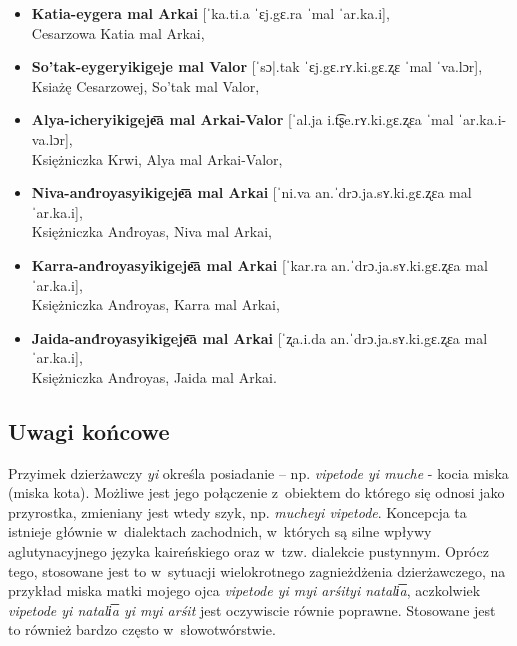 \begin{spacing}{1.1}
\begin{itemize}
\item \textbf{Katia-eygera mal Arkai} [ˈka.ti.a ˈɛj.gɛ.ra ˈmal ˈar.ka.i],\\ 
Cesarzowa Katia mal Arkai,
\item \textbf{So'tak-eygeryikigeje mal Valor} [ˈsɔ|.tak ˈɛj.gɛ.rʏ.ki.gɛ.ʐɛ 
ˈmal ˈva.lɔr],\\ Ksiażę Cesarzowej, So'tak mal Valor,
\item \textbf{Alya-icheryikigeje͞a mal Arkai-Valor} [ˈal.ja i.t͡ʂe.rʏ.ki.gɛ.ʐɛa ˈmal 
ˈar.ka.i-va.lɔr],\\ Księżniczka Krwi, Alya mal Arkai-Valor,
\item \textbf{Niva-and́royasyikigeje͞a mal Arkai} [ˈni.va an.ˈdrɔ.ja.sʏ.ki.gɛ.ʐɛa 
mal ˈar.ka.i],\\ Księżniczka And́royas, Niva mal Arkai,
\item \textbf{Karra-and́royasyikigeje͞a mal Arkai} [ˈkar.ra an.ˈdrɔ.ja.sʏ.ki.gɛ.ʐɛa 
mal ˈar.ka.i],\\ Księżniczka And́royas, Karra mal Arkai,
\item \textbf{Jaida-and́royasyikigeje͞a mal Arkai} [ˈʐa.i.da an.ˈdrɔ.ja.sʏ.ki.gɛ.ʐɛa
mal ˈar.ka.i],\\ Księżniczka And́royas, Jaida mal Arkai.
\end{itemize}


\subsection{Uwagi końcowe}

Przyimek dzierżawczy \emph{yi} określa posiadanie -- np. \emph{vipetode yi
muche} - kocia miska (miska kota). Możliwe jest jego połączenie z~obiektem do
którego się odnosi jako przyrostka, zmieniany jest wtedy szyk, np. \emph{mucheyi
vipetode}. Koncepcja ta istnieje głównie w~dialektach zachodnich, w~których są
silne wpływy aglutynacyjnego języka kaireńskiego oraz w~tzw. dialekcie
pustynnym. Oprócz tego, stosowane jest to w~sytuacji wielokrotnego zagnieżdżenia
dzierżawczego, na przykład miska matki mojego ojca \emph{vipetode yi myi arśityi
natali͞a}, aczkolwiek \emph{vipetode yi natali͞a yi myi arśit} jest oczywiscie
równie poprawne. Stosowane jest to również bardzo często w~słowotwórstwie.


\end{spacing}
